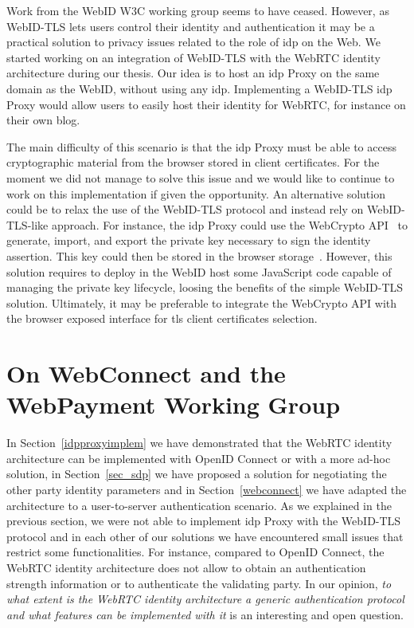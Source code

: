 Work from the WebID W3C working group seems to have ceased. 
However, as WebID-TLS lets users control their identity and authentication it may be a practical solution to privacy issues related to the role of \gls{idp} on the Web.
We started working on an integration of WebID-TLS with the WebRTC identity architecture during our thesis.
Our idea is to host an \gls{idp} Proxy on the same domain as the WebID, without using any \gls{idp}.
Implementing a WebID-TLS \gls{idp} Proxy would allow users to easily host their identity for WebRTC, for instance on their own blog. 

The main difficulty of this scenario is that the \gls{idp} Proxy must be able to access cryptographic material from the browser stored in client certificates.
For the moment we did not manage to solve this issue and we would like to continue to work on this implementation if given the opportunity.
An alternative solution could be to relax the use of the WebID-TLS protocol and instead rely on WebID-TLS-like approach.
For instance, the \gls{idp} Proxy could use the WebCrypto API~\cite{Watson:17:WCA} to generate, import, and export the private key necessary to sign the identity assertion.
This key could then be stored in the browser storage~\cite{Hickson:16:WSE}.
However, this solution requires to deploy in the WebID host some JavaScript code capable of managing the private key lifecycle, loosing the benefits of the simple WebID-TLS solution.
Ultimately, it may be preferable to integrate the WebCrypto API with the browser exposed interface for \gls{tls} client certificates selection.

\section{On WebConnect and the WebPayment Working Group}
\label{sec:pepay}
In Section~\ref{idpproxyimplem} we have demonstrated that the WebRTC identity architecture can be implemented with OpenID Connect or with a more ad-hoc solution, in Section~\ref{sec_sdp} we have proposed a solution for negotiating the other party identity parameters and in Section~\ref{webconnect} we have adapted the architecture to a user-to-server authentication scenario. 
As we explained in the previous section, we were not able to implement \gls{idp} Proxy with the WebID-TLS protocol and in each other of our solutions we have encountered small issues that restrict some functionalities.
For instance, compared to OpenID Connect, the WebRTC identity architecture does not allow to obtain an authentication strength information or to authenticate the validating party.
In our opinion, \textit{to what extent is the WebRTC identity architecture a generic authentication protocol and what features can be implemented with it} is an interesting and open question.

